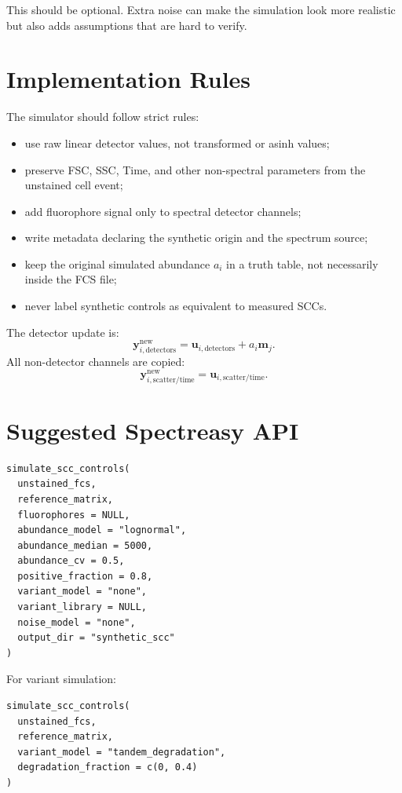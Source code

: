 \documentclass[11pt]{article}
\newcommand{\y}{\mathbf{y}}
\newcommand{\uvec}{\mathbf{u}}
\newcommand{\m}{\mathbf{m}}
\begin{document}
This should be optional. Extra noise can make the simulation look more realistic
but also adds assumptions that are hard to verify.

\section{Implementation Rules}

The simulator should follow strict rules:
\begin{itemize}
  \item use raw linear detector values, not transformed or asinh values;
  \item preserve FSC, SSC, Time, and other non-spectral parameters from the
        unstained cell event;
  \item add fluorophore signal only to spectral detector channels;
  \item write metadata declaring the synthetic origin and the spectrum source;
  \item keep the original simulated abundance \(a_i\) in a truth table, not
        necessarily inside the FCS file;
  \item never label synthetic controls as equivalent to measured SCCs.
\end{itemize}

The detector update is:
\begin{equation}
  \y_{i,\text{detectors}}^{\text{new}}
  =
  \uvec_{i,\text{detectors}}
  +
  a_i\m_j.
\end{equation}
All non-detector channels are copied:
\begin{equation}
  \y_{i,\text{scatter/time}}^{\text{new}}
  =
  \uvec_{i,\text{scatter/time}}.
\end{equation}

\section{Suggested Spectreasy API}

\begin{verbatim}
simulate_scc_controls(
  unstained_fcs,
  reference_matrix,
  fluorophores = NULL,
  abundance_model = "lognormal",
  abundance_median = 5000,
  abundance_cv = 0.5,
  positive_fraction = 0.8,
  variant_model = "none",
  variant_library = NULL,
  noise_model = "none",
  output_dir = "synthetic_scc"
)
\end{verbatim}

For variant simulation:
\begin{verbatim}
simulate_scc_controls(
  unstained_fcs,
  reference_matrix,
  variant_model = "tandem_degradation",
  degradation_fraction = c(0, 0.4)
)
\end{verbatim}
\end{document}
